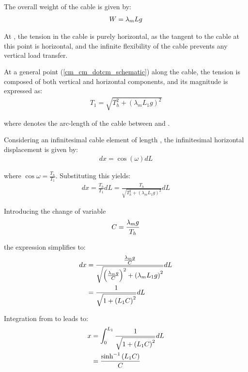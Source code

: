 The overall weight  of the cable is given by:
\begin{align}
	W = \lambda_m L g
	\label{cm_cm_dotcm_weight_equation}
\end{align}

At , the tension in the cable is purely horizontal, as the tangent to the cable at
this point is horizontal, and the infinite flexibility of the cable prevents any vertical load
transfer.

At a general point  (\cref{cm_cm_dotcm_schematic}) along the cable, the tension
is composed of both vertical and horizontal components, and its magnitude  is
expressed as:
\begin{align}
	T_1 = \sqrt{T_h^2 + \left(\lambda_m L_1 g\right)^2}
	\label{cm_cm_dotcm_tension_equation}
\end{align}

where  denotes the arc-length of the cable between  and
.

Considering an infinitesimal cable element of length , the infinitesimal horizontal
displacement  is given by:
\begin{align}
	dx = \cos{\left(\omega\right)} dL
\end{align}

where $\cos{\omega} = \frac{T_h}{T_1}$. Substituting this yields:
\begin{align}
	dx = \frac{T_h}{T_1} dL = \frac{T_h}{\sqrt{T_h^2 + \left(\lambda_m L_1 g\right)^2}} dL
\end{align}

Introducing the change of variable
\begin{align}
	C = \frac{\lambda_m g}{T_h}
	\label{cm_cm_dotcm_change_of_variable}
\end{align}

the expression simplifies to:
\begin{align}
	dx & = \frac{\frac{\lambda_m g}{C}}{\sqrt{\left(\frac{\lambda_m g}{C}\right)^2 + \left(\lambda_m L_1 g\right)^2}} dL \\
	   & = \frac{1}{\sqrt{1 + \left(L_1 C\right)^2}} dL
\end{align}

Integration from  to  leads to:
\begin{align}
	x & = \int_0^{L_1} \frac{1}{\sqrt{1 + \left(L_1 C\right)^2}} dL \\
	  & = \frac{\sinh^{-1}\left(L_1 C\right)}{C}
	\label{cm_cm_dotcm_horizontal_catenary_coordinate}
\end{align}

